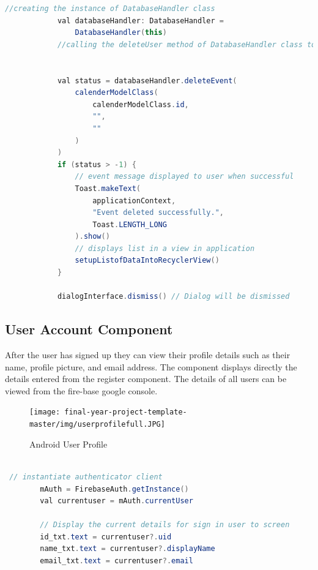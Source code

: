 \begin{lstlisting}[language=Java, caption=Update Calendar Event  ]
     //creating the instance of DatabaseHandler class
            val databaseHandler: DatabaseHandler =
                DatabaseHandler(this)
            //calling the deleteUser method of DatabaseHandler class to delete record


            val status = databaseHandler.deleteEvent(
                calenderModelClass(
                    calenderModelClass.id,
                    "",
                    ""
                )
            )
            if (status > -1) {
                // event message displayed to user when successful
                Toast.makeText(
                    applicationContext,
                    "Event deleted successfully.",
                    Toast.LENGTH_LONG
                ).show()
                // displays list in a view in application
                setupListofDataIntoRecyclerView()
            }

            dialogInterface.dismiss() // Dialog will be dismissed
\end{lstlisting}

\subsection{User Account Component}

After the user has signed up they can view their profile details such as their name, profile picture, and email address. The component displays directly the details entered from the register component. The details of all users can be viewed from the fire-base google console.


\begin{figure}[H]
  \centering
  
    \texttt{[image: final-year-project-template-master/img/userprofilefull.JPG]}

     \caption{Android User Profile}
\end{figure}






\begin{lstlisting}[language=Java, caption=Dashboard Kotlin User Profile code stubs ]

 // instantiate authenticator client
        mAuth = FirebaseAuth.getInstance()
        val currentuser = mAuth.currentUser

        // Display the current details for sign in user to screen
        id_txt.text = currentuser?.uid
        name_txt.text = currentuser?.displayName
        email_txt.text = currentuser?.email

\end{lstlisting}

